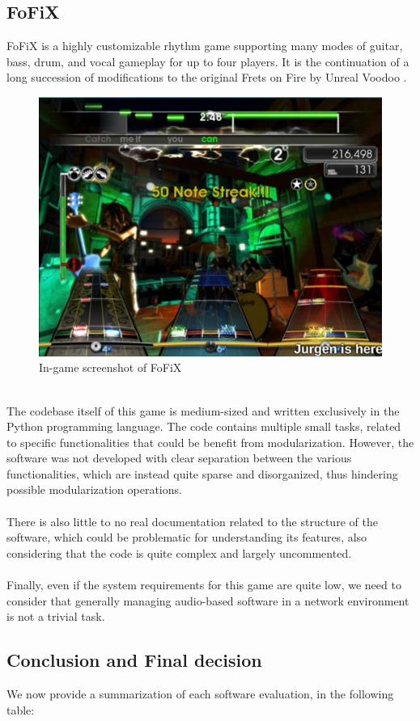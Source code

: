 \subsection{FoFiX}
FoFiX is a highly customizable rhythm game supporting many modes of guitar, bass, drum, and vocal gameplay for up to four players. It is the continuation of a long succession of modifications to the original Frets on Fire by Unreal Voodoo \cite{site:fofix-github}. 
\begin{figure}[h!]
	\centering
	\includegraphics[width=0.75\linewidth]{"immagini/Feasibility study/Fofix"}
	\caption[In-game screenshot of FoFiX]{In-game screenshot of FoFiX}
	\label{fig:fofix}
\end{figure}
\\ The codebase itself of this game is medium-sized and written exclusively in the Python programming language. The code contains multiple small tasks, related to specific functionalities that could be benefit from modularization. However, the software was not developed with clear separation between the various functionalities, which are instead quite sparse and disorganized, thus hindering possible modularization operations. \\ \\
There is also little to no real documentation related to the structure of the software, which could be problematic for understanding its features, also considering that the code is quite complex and largely uncommented. \\ \\
Finally, even if the system requirements for this game are quite low, we need to consider that generally managing audio-based software in a network environment is not a trivial task.

\subsection{Conclusion and Final decision}
We now provide a summarization of each software evaluation, in the following table:

